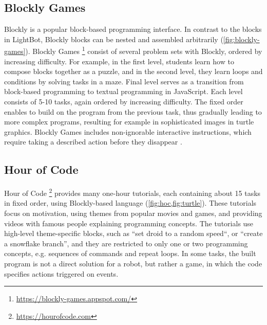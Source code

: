 \subsection{Blockly Games}
\label{sec:blockly-games}
Blockly is a popular block-based programming interface.
In contrast to the blocks in LightBot,
Blockly blocks can be nested and assembled arbitrarily %
(\cref{fig:blockly-games}).
Blockly Games%
\footnote{\url{https://blockly-games.appspot.com/}}
consist of several problem sets with Blockly, ordered by increasing difficulty.
For example, in the first level, students learn how to compose blocks together
as a puzzle, and in the second level, they learn loops and conditions by solving
tasks in a maze. Final level serves as a transition from block-based
programming to textual programming in JavaScript.
Each level consists of 5-10 tasks, again ordered by increasing difficulty. %
The fixed order enables to build on the program from the previous task,
thus gradually leading to more complex programs,
resulting for example in sophisticated images in turtle graphics.
Blockly Games includes non-ignorable interactive instructions,
which require taking a described action before they disappear
\cite{blockly-10-things}.


\subsection{Hour of Code}
\label{sec:hoc}
Hour of Code%
\footnote{\url{https://hourofcode.com}}
provides many one-hour tutorials, each containing about 15 tasks in fixed order,
using Blockly-based language
(\cref{fig:hoc,fig:turtle}).
These tutorials focus on motivation, using themes from popular movies and
games, and providing videos with famous people explaining programming concepts.
The tutorials use high-level theme-specific blocks, such as ``set droid to a
random speed``, or ``create a snowflake branch'',
and they are restricted to only one or two programming
concepts, e.g. sequences of commands and repeat loops. %
In some tasks, the built program is not a direct solution for a robot,
but rather a game, in which the code specifies actions triggered on events.



